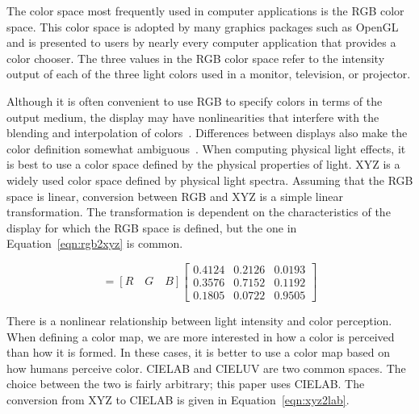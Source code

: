 \documentclass{acmsiggraph}               %
\newcommand{\lcite}[1]{~\cite{#1}}
\newcommand{\RGB}{RGB\xspace}
\newcommand{\XYZ}{XYZ\xspace}
\newcommand{\Lab}{CIELAB\xspace}
\newcommand{\Luv}{CIELUV\xspace}
\begin{document}
The color space most frequently used in computer applications is the \RGB
color space.  This color space is adopted by many graphics packages such as
OpenGL and is presented to users by nearly every computer application
that provides a color chooser.  The three values in the \RGB
color space refer to the intensity output of each of the three light colors
used in a monitor, television, or projector.

Although it is often convenient to use \RGB to specify colors in terms of
the output medium, the display may have nonlinearities that interfere with
the blending and interpolation of colors\lcite{Stone03}.  Differences
between displays also make the color definition somewhat
ambiguous\lcite{Fortner97}.  When computing physical light effects, it is
best to use a color space defined by the physical properties of light.
\XYZ is a widely used color space defined by physical light
spectra.  Assuming that the \RGB space is linear, conversion between \RGB
and \XYZ is a simple linear transformation.  The transformation is
dependent on the characteristics of the display for which the \RGB space is
defined, but the one in Equation~\ref{eqn:rgb2xyz} is common.

\begin{equation}
  [X \quad Y \quad Z] = [R \quad G \quad B]
  \begin{bmatrix}
    0.4124 & 0.2126 & 0.0193 \\
    0.3576 & 0.7152 & 0.1192 \\
    0.1805 & 0.0722 & 0.9505
  \end{bmatrix}
  \label{eqn:rgb2xyz}
\end{equation}

There is a nonlinear relationship between light intensity and color
perception.  When defining a color map, we are more
interested in how a color is perceived than how it is formed.  In these
cases, it is better to use a color map based on how humans perceive color.
\Lab and \Luv are two common spaces.  The choice between the two is fairly
arbitrary; this paper uses \Lab.  The conversion from \XYZ to \Lab is given
in Equation~\ref{eqn:xyz2lab}.
\end{document}
